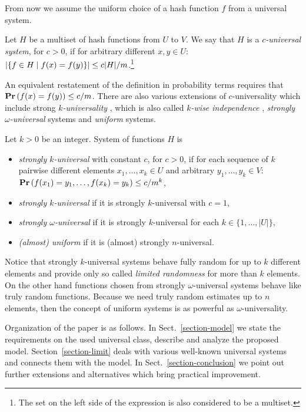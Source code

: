 From now we assume the uniform choice of a hash function $f$ from a universal system.

\begin{definition}
\label{definition-c-universal-system}
Let $H$ be a multiset of hash functions from $U$ to $V$. We say that $H$ is a \emph{$c$-universal system}, for $c > 0$, if for arbitrary different $x, y \in U$: $\left|\lbrace f \in H \mid f(x) = f(y) \rbrace\right| \leq {c|H|}/{m}$.\footnote{The set on the left side of the expression is also considered to be a multiset.}
\end{definition}

An equivalent restatement of the definition in probability terms requires that $\mathbf{Pr}\left(f(x) = f(y)\right) \leq c/m$. There are also various extensions of $c$-universality which include strong \emph{$k$-universality} \cite{DBLP:conf/focs/WegmanC79}, which is also called \emph{$k$-wise independence} \cite{DBLP:conf/focs/WegmanC79}, \emph{strongly $\omega$-universal} \cite{DBLP:conf/focs/WegmanC79} systems and \emph{uniform} \cite{DBLP:journals/siamcomp/PaghP08} systems.
\begin{definition}
Let $k > 0$ be an integer. System of functions $H$ is
\begin{itemize}
	\item \emph{strongly $k$-universal} with constant $c$, for $c > 0$, if for each sequence of $k$ pairwise different elements $x_1, \dots, x_k \in U$ and arbitrary $y_1, \dots, y_k \in V$: $\mathbf{Pr}\left(f(x_1) = y_1, \dots, f(x_k) = y_k\right) \leq {c}/{m^k}$,
	\item \emph{strongly $k$-universal} if it is strongly $k$-universal with $c = 1$,
	\item \emph{strongly $\omega$-universal} if it is strongly $k$-universal for each $k \in \{1, \dots, |U|\}$,
	\item \emph{(almost) uniform} if it is (almost) strongly $n$-universal.
\end{itemize}
\end{definition}

Notice that strongly $k$-universal systems behave fully random for up to $k$ different elements and provide only so called \emph{limited randomness} for more than $k$ elements. On the other hand functions chosen from strongly $\omega$-universal systems behave like truly random functions. Because we need truly random estimates up to $n$ elements, then the concept of uniform systems is as powerful as $\omega$-universality.

Organization of the paper is as follows. In Sect.~\ref{section-model} we state the requirements on the used universal class, describe and analyze the proposed model. Section~\ref{section-limit} deals with various well-known universal systems and connects them with the model. In Sect.~\ref{section-conclusion} we point out further extensions and alternatives which bring practical improvement.
